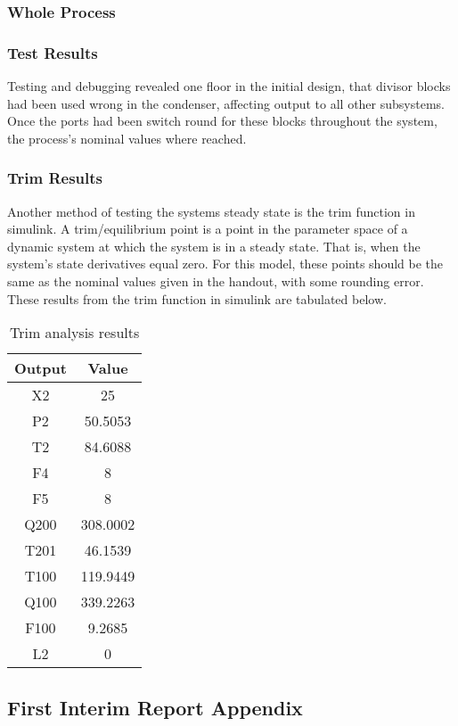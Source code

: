 \documentclass[11pt]{article}
\begin{document}
\subsubsection{Whole Process}
\subsubsection{Test Results}
Testing and debugging revealed one floor in the initial design, that divisor blocks had been used wrong in the condenser, affecting output to all other subsystems. Once the ports had been switch round for these blocks throughout the system, the process's nominal values where reached. 

\subsubsection{Trim Results}
Another method of testing the systems steady state is the trim function in simulink. A trim/equilibrium point is a point in the parameter space of a dynamic system at which the system is in a steady state. That is, when the system's state derivatives equal zero. For this model, these points should be the same as the nominal values given in the handout, with some rounding error. These results from the trim function in simulink are tabulated below.
\begin{table}[H]
\centering
\label{my-label}
\begin{tabular}{|cc|}
\hline
Output & Value    \\ \hline
X2     & 25       \\
P2     & 50.5053  \\
T2     & 84.6088  \\
F4     & 8        \\
F5     & 8        \\
Q200   & 308.0002 \\
T201   & 46.1539  \\
T100   & 119.9449 \\
Q100   & 339.2263 \\
F100   & 9.2685   \\
L2     & 0        \\ \hline
\end{tabular}
\caption{Trim analysis results}
\end{table}

\subsection{First Interim Report Appendix}
\end{document}
